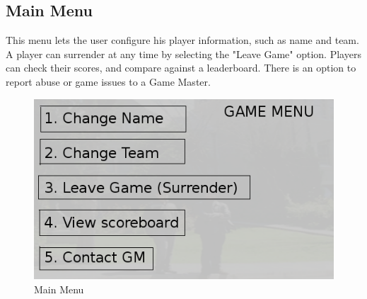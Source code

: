 \documentclass{beamer}
\begin{document}
\begin{frame}
\subsection{Main Menu}
This menu lets the user configure his player information, such as name and team. A player can surrender at any time by selecting the "Leave Game" option. Players can check their scores, and compare against a leaderboard. There is an option to report abuse or game issues to a Game Master.
\begin{figure}[htb]
\centering
\includegraphics[scale=0.5]{main-menu}
\caption{Main Menu}
\end{figure}
\end{frame}
\end{document}
